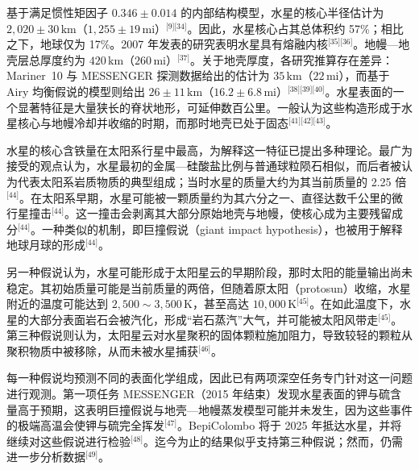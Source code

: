 基于满足惯性矩因子 \(0.346\pm0.014\) 的内部结构模型，水星的核心半径估计为 \(2{,}020\pm30\,\mathrm{km}\)（\(1{,}255\pm19\,\mathrm{mi}\)）\(^\text{[9][34]}\)。因此，水星核心占其总体积约 57\%；相比之下，地球仅为 17\%。2007 年发表的研究表明水星具有熔融内核\(^\text{[35][36]}\)。地幔—地壳层总厚度约为 \(420\,\mathrm{km}\)（\(260\,\mathrm{mi}\)）\(^\text{[37]}\)。关于地壳厚度，各研究推算存在差异：Mariner~10 与 MESSENGER 探测数据给出的估计为 \(35\,\mathrm{km}\)（\(22\,\mathrm{mi}\)），而基于 Airy 均衡假说的模型则给出 \(26\pm11\,\mathrm{km}\)（\(16.2\pm6.8\,\mathrm{mi}\)）\(^\text{[38][39][40]}\)。水星表面的一个显著特征是大量狭长的脊状地形，可延伸数百公里。一般认为这些构造形成于水星核心与地幔冷却并收缩的时期，而那时地壳已处于固态\(^\text{[41][42][43]}\)。

水星的核心含铁量在太阳系行星中最高，为解释这一特征已提出多种理论。最广为接受的观点认为，水星最初的金属—硅酸盐比例与普通球粒陨石相似，而后者被认为代表太阳系岩质物质的典型组成；当时水星的质量大约为其当前质量的 2.25 倍\(^\text{[44]}\)。在太阳系早期，水星可能被一颗质量约为其六分之一、直径达数千公里的微行星撞击\(^\text{[44]}\)。这一撞击会剥离其大部分原始地壳与地幔，使核心成为主要残留成分\(^\text{[44]}\)。一种类似的机制，即巨撞假说（giant impact hypothesis），也被用于解释地球月球的形成\(^\text{[44]}\)。

另一种假说认为，水星可能形成于太阳星云的早期阶段，那时太阳的能量输出尚未稳定。其初始质量可能是当前质量的两倍，但随着原太阳（protosun）收缩，水星附近的温度可能达到 \(2{,}500\sim3{,}500\,\mathrm{K}\)，甚至高达 \(10{,}000\,\mathrm{K}\)\(^\text{[45]}\)。在如此温度下，水星的大部分表面岩石会被汽化，形成“岩石蒸汽”大气，并可能被太阳风带走\(^\text{[45]}\)。第三种假说则认为，太阳星云对水星聚积的固体颗粒施加阻力，导致较轻的颗粒从聚积物质中被移除，从而未被水星捕获\(^\text{[46]}\)。

每一种假说均预测不同的表面化学组成，因此已有两项深空任务专门针对这一问题进行观测。第一项任务 MESSENGER（2015 年结束）发现水星表面的钾与硫含量高于预期，这表明巨撞假说与地壳—地幔蒸发模型可能并未发生，因为这些事件的极端高温会使钾与硫完全挥发\(^\text{[47]}\)。BepiColombo 将于 2025 年抵达水星，并将继续对这些假说进行检验\(^\text{[48]}\)。迄今为止的结果似乎支持第三种假说；然而，仍需进一步分析数据\(^\text{[49]}\)。

